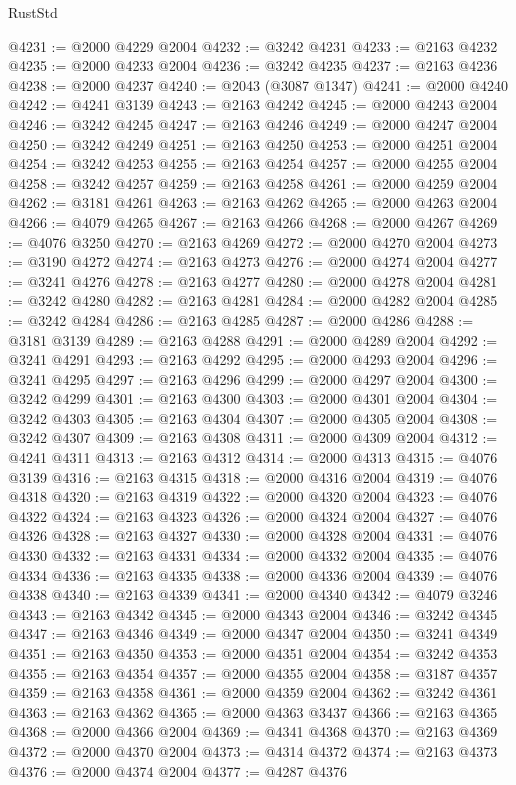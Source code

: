 \begin{lexlean}{RustStd}
\begin{coremodule}
@4231 := @2000 @4229 @2004
@4232 := @3242 @4231
@4233 := @2163 @4232
@4235 := @2000 @4233 @2004
@4236 := @3242 @4235
@4237 := @2163 @4236
@4238 := @2000 @4237
@4240 := @2043 (@3087 @1347)
@4241 := @2000 @4240
@4242 := @4241 @3139
@4243 := @2163 @4242
@4245 := @2000 @4243 @2004
@4246 := @3242 @4245
@4247 := @2163 @4246
@4249 := @2000 @4247 @2004
@4250 := @3242 @4249
@4251 := @2163 @4250
@4253 := @2000 @4251 @2004
@4254 := @3242 @4253
@4255 := @2163 @4254
@4257 := @2000 @4255 @2004
@4258 := @3242 @4257
@4259 := @2163 @4258
@4261 := @2000 @4259 @2004
@4262 := @3181 @4261
@4263 := @2163 @4262
@4265 := @2000 @4263 @2004
@4266 := @4079 @4265
@4267 := @2163 @4266
@4268 := @2000 @4267
@4269 := @4076 @3250
@4270 := @2163 @4269
@4272 := @2000 @4270 @2004
@4273 := @3190 @4272
@4274 := @2163 @4273
@4276 := @2000 @4274 @2004
@4277 := @3241 @4276
@4278 := @2163 @4277
@4280 := @2000 @4278 @2004
@4281 := @3242 @4280
@4282 := @2163 @4281
@4284 := @2000 @4282 @2004
@4285 := @3242 @4284
@4286 := @2163 @4285
@4287 := @2000 @4286
@4288 := @3181 @3139
@4289 := @2163 @4288
@4291 := @2000 @4289 @2004
@4292 := @3241 @4291
@4293 := @2163 @4292
@4295 := @2000 @4293 @2004
@4296 := @3241 @4295
@4297 := @2163 @4296
@4299 := @2000 @4297 @2004
@4300 := @3242 @4299
@4301 := @2163 @4300
@4303 := @2000 @4301 @2004
@4304 := @3242 @4303
@4305 := @2163 @4304
@4307 := @2000 @4305 @2004
@4308 := @3242 @4307
@4309 := @2163 @4308
@4311 := @2000 @4309 @2004
@4312 := @4241 @4311
@4313 := @2163 @4312
@4314 := @2000 @4313
@4315 := @4076 @3139
@4316 := @2163 @4315
@4318 := @2000 @4316 @2004
@4319 := @4076 @4318
@4320 := @2163 @4319
@4322 := @2000 @4320 @2004
@4323 := @4076 @4322
@4324 := @2163 @4323
@4326 := @2000 @4324 @2004
@4327 := @4076 @4326
@4328 := @2163 @4327
@4330 := @2000 @4328 @2004
@4331 := @4076 @4330
@4332 := @2163 @4331
@4334 := @2000 @4332 @2004
@4335 := @4076 @4334
@4336 := @2163 @4335
@4338 := @2000 @4336 @2004
@4339 := @4076 @4338
@4340 := @2163 @4339
@4341 := @2000 @4340
@4342 := @4079 @3246
@4343 := @2163 @4342
@4345 := @2000 @4343 @2004
@4346 := @3242 @4345
@4347 := @2163 @4346
@4349 := @2000 @4347 @2004
@4350 := @3241 @4349
@4351 := @2163 @4350
@4353 := @2000 @4351 @2004
@4354 := @3242 @4353
@4355 := @2163 @4354
@4357 := @2000 @4355 @2004
@4358 := @3187 @4357
@4359 := @2163 @4358
@4361 := @2000 @4359 @2004
@4362 := @3242 @4361
@4363 := @2163 @4362
@4365 := @2000 @4363 @3437
@4366 := @2163 @4365
@4368 := @2000 @4366 @2004
@4369 := @4341 @4368
@4370 := @2163 @4369
@4372 := @2000 @4370 @2004
@4373 := @4314 @4372
@4374 := @2163 @4373
@4376 := @2000 @4374 @2004
@4377 := @4287 @4376

\end{coremodule}
\end{lexlean}
